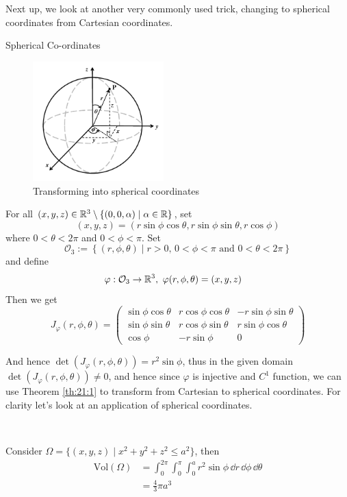 \documentclass[../Analysis-3.tex]{subfiles}
\begin{document}
Next up, we look at another very commonly used trick, changing to spherical coordinates from Cartesian coordinates.

\begin{Eg}{Spherical Co-ordinates}{}
  \begin{figure}
    \centering
    \includegraphics[width=0.45\textwidth]{../figures/lec21.2.png}
    \caption{Transforming into spherical coordinates}
    \label{fig2:21}
  \end{figure}
  For all $(x,y,z) \in \mathbb{R}^3 \setminus \{ (0,0,\alpha) \mid \alpha \in \mathbb{R} \}$, set
  \[
    (x,y,z) = (r\sin\phi\cos\theta, r\sin\phi\sin\theta, r \cos\phi)
  \]
  where $0 < \theta < 2\pi$ and $0 < \phi < \pi$. Set
  \[
    \mathcal{O}_3 := \left\{ (r,\phi,\theta) \mid r >0, \, 0 < \phi < \pi \mbox{ and } 0 < \theta < 2\pi \right\}
  \]
  and define
  \begin{align*}
    \varphi : \mathcal{O}_3 & \to \mathbb{R}^3, \ \varphi(r,\phi,\theta) = (x,y,z)
  \end{align*}
  Then we get
  \[
    J_{\varphi}(r,\phi,\theta) = \begin{pmatrix}
      \sin\phi\cos\theta & r\cos\phi\cos\theta & -r\sin\phi\sin\theta \\
      \sin\phi\sin\theta & r\cos\phi\sin\theta & r\sin\phi\cos\theta  \\
      \cos\phi           & -r\sin\phi          & 0
    \end{pmatrix}
  \]


  And hence $\det(J_{\varphi}(r,\phi,\theta)) = r^2 \sin \phi$, thus in the given domain $\det(J_{\varphi}(r,\phi,\theta)) \neq 0$, and hence since $\varphi$ is injective and $C^1$ function, we can use Theorem \ref{th:21:1} to transform from Cartesian to spherical coordinates. For clarity let's look at an application of spherical coordinates.

  \

  Consider $\Omega = \{ (x,y,z) \mid x^2 + y^2 + z^2 \leq a^2 \}$, then
  \begin{align*}
    \mathrm{Vol}(\Omega) & = \int_0^{2\pi}\int_0^{\pi} \int_0^a r^2 \sin \phi \, \dd r \, \dd \phi \, \dd \theta \\
                         & = \frac{4}{3}\pi a^3
  \end{align*}
\end{Eg}
\end{document}
